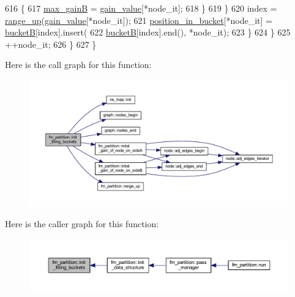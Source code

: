\begin{DoxyCode}
616             \{
617             \mbox{\hyperlink{classfm__partition_ac230f89828768eaf51374c0bc3b37558}{max\_gainB}} = \mbox{\hyperlink{classfm__partition_ae8176f4ce82305abfd58e519d2cdd91d}{gain\_value}}[*node\_it];
618             \}
619         \}
620         index = \mbox{\hyperlink{classfm__partition_ac49d477ecbf512fa375b76a472ec54f8}{range\_up}}(\mbox{\hyperlink{classfm__partition_ae8176f4ce82305abfd58e519d2cdd91d}{gain\_value}}[*node\_it]);
621         \mbox{\hyperlink{classfm__partition_ad17406d94b53c327e31b28e462de010f}{position\_in\_bucket}}[*node\_it] = \mbox{\hyperlink{classfm__partition_ae6a5b5f3f2d95ea229882e861ccfc9e4}{bucketB}}[index].insert(
622             \mbox{\hyperlink{classfm__partition_ae6a5b5f3f2d95ea229882e861ccfc9e4}{bucketB}}[index].end(), *node\_it);
623         \}
624     \}
625     ++node\_it;
626     \}
627 \}
\end{DoxyCode}
Here is the call graph for this function\+:\nopagebreak
\begin{figure}[H]
\begin{center}
\leavevmode
\includegraphics[width=350pt]{classfm__partition_ac510befe1837c646a260a14c110d7a79_cgraph}
\end{center}
\end{figure}
Here is the caller graph for this function\+:\nopagebreak
\begin{figure}[H]
\begin{center}
\leavevmode
\includegraphics[width=350pt]{classfm__partition_ac510befe1837c646a260a14c110d7a79_icgraph}
\end{center}
\end{figure}
\mbox{\label{classfm__partition_aad791ac648a9ff4694c8960f49dcc018}} 
